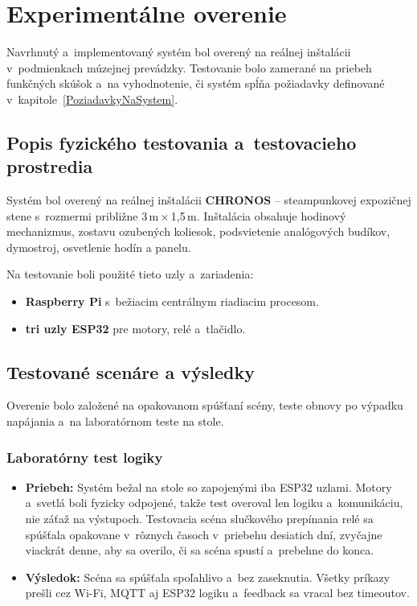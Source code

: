 \chapter{Experimentálne overenie}
\label{ExperimentalneOverenie}

Navrhnutý a~implementovaný systém bol overený na reálnej inštalácii
v~podmienkach múzejnej prevádzky. Testovanie bolo zamerané na priebeh
funkčných skúšok a~na vyhodnotenie, či systém spĺňa požiadavky
definované v~kapitole~\ref{PoziadavkyNaSystem}.

\section{Popis fyzického testovania a~testovacieho prostredia}
\label{PopisDemonstracie}

Systém bol overený na reálnej inštalácii \textbf{CHRONOS} --
steampunkovej expozičnej stene s~rozmermi približne
3\,m\,$\times$\,1{,}5\,m. Inštalácia obsahuje hodinový
mechanizmus, zostavu ozubených koliesok, podsvietenie analógových budíkov, dymostroj,
osvetlenie hodín a panelu.

Na testovanie boli použité tieto uzly a~zariadenia:
\begin{itemize}
    \item \textbf{Raspberry Pi} s~bežiacim centrálnym riadiacim procesom.
    \item \textbf{tri uzly ESP32} pre motory, relé a~tlačidlo.
\end{itemize}

\section{Testované scenáre a výsledky}
\label{TestovaneScenare}

Overenie bolo založené na opakovanom spúšťaní scény, teste obnovy
po výpadku napájania a~na laboratórnom teste na stole.

\subsection{Laboratórny test logiky}
\begin{itemize}
    \item \textbf{Priebeh:} Systém bežal na stole so zapojenými iba ESP32 uzlami.
        Motory a~svetlá boli fyzicky odpojené, takže test overoval len logiku a~komunikáciu,
        nie záťaž na výstupoch. Testovacia scéna slučkového prepínania relé sa spúšťala opakovane
        v~rôznych časoch v~priebehu desiatich dní, zvyčajne viackrát denne,
        aby sa overilo, či sa scéna spustí a~prebehne do konca.
    \item \textbf{Výsledok:} Scéna sa spúšťala spoľahlivo a~bez zaseknutia.
        Všetky príkazy prešli cez Wi-Fi, MQTT aj ESP32 logiku a~feedback sa vracal bez timeoutov.
\end{itemize}

